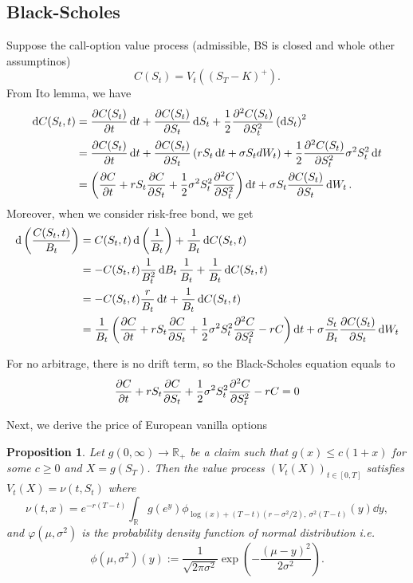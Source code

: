 \documentclass[10pt]{article}
\theoremstyle{remark}
\theoremstyle{plain}
\newtheorem{Proposition}{Proposition}[section]
\newcommand{\R}{\mathbb{R}}
\numberwithin{equation}{section}
\renewcommand{\leq}{\leqslant}
\renewcommand{\geq}{\geqslant}
\begin{document}
\subsection{Black-Scholes}
Suppose the call-option value process (admissible, BS is closed and whole other assumptinos)
\[
	C(S_t) = V_t((S_T-K)^+).
\]
From Ito lemma, we have
\begin{align*}
	\dd{C(S_t, t)} & = \pdv{C(S_t)}{t}\dd{t} +  \pdv{C(S_t)}{S_t}\dd{S_t} + \frac{1}{2} \pdv[2]{C(S_t)}{S_t}  \left(\dd{S_t}\right)^2
	\\
	& = \pdv{C(S_t)}{t}\dd{t}  +  \pdv{C(S_t)}{S_t}\left(r S_t \dd{t} + \sigma S_t dW_t \right) + \frac{1}{2} \pdv[2]{C(S_t)}{S_t}  \sigma^2 S_t^2  \dd{t}
	\\
	&
	= \left(\pdv{C}{t}  + r S_t \pdv{C}{S_t} + \frac{1}{2}  \sigma^2 S_t^2 \pdv[2]{C}{S_t}\right) \dd{t}   + \sigma S_t \pdv{C(S_t)}{S_t} \dd{W_t} .
\end{align*}
Moreover, when we consider risk-free bond, we get
\begin{align*}
	\dd{\left(\frac{C(S_t,t)}{B_t}\right)} & = C(S_t,t) \dd{\left(\frac{1}{B_t}\right)} + \frac{1}{B_t} \dd{C(S_t,t)}
	\\
	& =  -  C(S_t,t) \frac{1}{B^2_t} \dd{B_t} \frac{1}{B_t}  + \frac{1}{B_t} \dd{C(S_t,t)} 
	\\
	& = -  C(S_t,t) \frac{r}{B_t} \dd{t} + \frac{1}{B_t} \dd{C(S_t,t)} 
	\\
	& = \frac{1}{B_t} \left(\pdv{C}{t}  + r S_t \pdv{C}{S_t} + \frac{1}{2}  \sigma^2 S_t^2 \pdv[2]{C}{S_t} - rC\right) \dd{t} + \sigma \frac{S_t}{B_t}\pdv{C(S_t)}{S_t}  \dd{W_t}  
\end{align*}


For no arbitrage, there is no drift term, so the Black-Scholes equation equals to
\begin{equation}\label{black_scholes}
	\pdv{C}{t}  + r S_t \pdv{C}{S_t} + \frac{1}{2}  \sigma^2 S_t^2 \pdv[2]{C}{S_t} -rC = 0
\end{equation}

Next, we derive the price of European vanilla options
\begin{Proposition}\label{BS_0}
	Let $g(0,\infty) \to \R_+$ be a claim such that $g(x) \leq c(1+x)$ for some $c\geq 0$ and $X = g(S_T)$. Then the value process $(V_t(X))_{t\in[0,T]}$ satisfies $V_t(X) = \nu(t,S_t)$ where
	\begin{equation}\label{option_v}
		\nu(t,x) = e^{-r(T-t)} \int_\R g(e^y) \phi_{\log(x)+ (T-t)(r-\sigma^2/2),\ \sigma^2(T-t)} (y) \dd{y},
	\end{equation}
	and $\varphi(\mu, \sigma^2)$ is the probability density function of normal distribution i.e.
	\[
	\phi(\mu, \sigma^2)(y) := \frac{1}{\sqrt{2\pi \sigma^2}} \exp(-\frac{(\mu -y)^2}{2\sigma^2}).
	\]
\end{Proposition}
\end{document}
